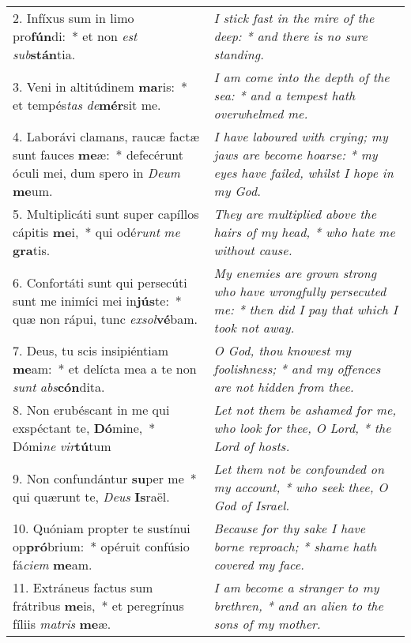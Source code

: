 \begin{longtable}{p{10cm} | p{6cm}}
2. Infíxus sum in limo pro\textbf{fún}di:~* et non \textit{est} \textit{sub}\textbf{stán}tia.
 & \textit{\small I stick fast in the mire of the deep: * and there is no sure standing.
}\\
3. Veni in altitúdinem \textbf{ma}ris:~* et tempés\textit{tas} \textit{de}\textbf{mér}sit me.
 & \textit{\small I am come into the depth of the sea: * and a tempest hath overwhelmed me.
}\\
4. Laborávi clamans, raucæ factæ sunt fauces \textbf{me}æ:~* defecérunt óculi mei, dum spero in \textit{De}\textit{um} \textbf{me}um.
 & \textit{\small I have laboured with crying; my jaws are become hoarse: * my eyes have failed, whilst I hope in my God.
}\\
5. Multiplicáti sunt super capíllos cápitis \textbf{me}i,~* qui odé\textit{runt} \textit{me} \textbf{gra}tis.
 & \textit{\small They are multiplied above the hairs of my head, * who hate me without cause.
}\\
6. Confortáti sunt qui persecúti sunt me inimíci mei in\textbf{jús}te:~* quæ non rápui, tunc \textit{ex}\textit{sol}\textbf{vé}bam.
 & \textit{\small My enemies are grown strong who have wrongfully persecuted me: * then did I pay that which I took not away.
}\\
7. Deus, tu scis insipiéntiam \textbf{me}am:~* et delícta mea a te non \textit{sunt} \textit{abs}\textbf{cón}dita.
 & \textit{\small O God, thou knowest my foolishness; * and my offences are not hidden from thee.
}\\
8. Non erubéscant in me qui exspéctant te, \textbf{Dó}mine,~* Dómi\textit{ne} \textit{vir}\textbf{tú}tum
 & \textit{\small Let not them be ashamed for me, who look for thee, O Lord, * the Lord of hosts.
}\\
9. Non confundántur \textbf{su}per me~* qui quærunt te, \textit{De}\textit{us} \textbf{Is}raël.
 & \textit{\small Let them not be confounded on my account, * who seek thee, O God of Israel.
}\\
10. Quóniam propter te sustínui op\textbf{pró}brium:~* opéruit confúsio fá\textit{ci}\textit{em} \textbf{me}am.
 & \textit{\small Because for thy sake I have borne reproach; * shame hath covered my face.
}\\
11. Extráneus factus sum frátribus \textbf{me}is,~* et peregrínus fíliis \textit{ma}\textit{tris} \textbf{me}æ.
 & \textit{\small I am become a stranger to my brethren, * and an alien to the sons of my mother.
}\\

\end{longtable}
